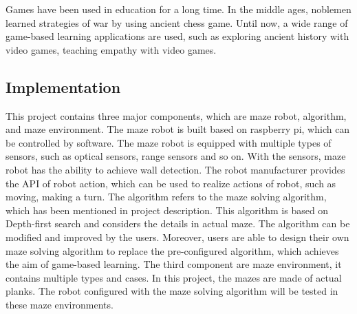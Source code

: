 \documentclass[11pt,times,oneside,openright,hardcopy]{eeereport}
\begin{document}
Games have been used in education for a long time. In the middle ages, noblemen learned strategies of war by using ancient chess game. Until now, a wide range of game-based learning applications are used, such as exploring ancient history with video games, teaching empathy with video games.


\subsection{Implementation}
This project contains three major components, which are maze robot, algorithm, and maze environment.
The maze robot is built based on raspberry pi, which can be controlled by software. The maze robot is equipped with multiple types of sensors, such as optical sensors, range sensors and so on. With the sensors, maze robot has the ability to achieve wall detection. The robot manufacturer provides the API of robot action, which can be used to realize actions of robot, such as moving, making a turn.
The algorithm refers to the maze solving algorithm, which has been mentioned in project description. This algorithm is based on Depth-first search and considers the details in actual maze. The algorithm can be modified and improved by the users. Moreover, users are able to design their own maze solving algorithm to replace the pre-configured algorithm, which achieves the aim of game-based learning.
The third component are maze environment, it contains multiple types and cases. In this project, the mazes are made of actual planks. The robot configured with the maze solving algorithm will be tested in these maze environments.
\end{document}
